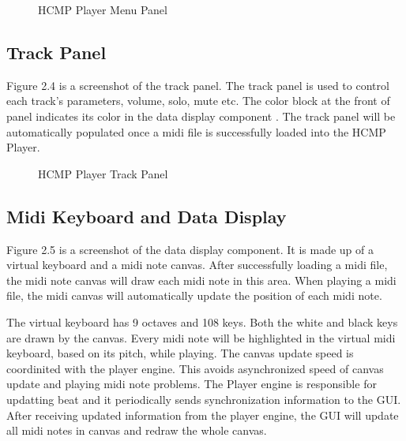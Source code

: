 \begin{figure}[H]
\caption{HCMP Player Menu Panel}
\label{fig:speciation}
\end{figure}

\subsection{Track Panel}

Figure 2.4 is a screenshot of the track panel. The track panel is used to 
control each track's parameters, volume, solo, mute etc. The color
block at the front of panel indicates its color in the data display component . The 
track panel will be automatically populated once a midi file is successfully 
loaded into the HCMP Player.
\begin{figure}[H]
\caption{HCMP Player Track Panel}
\label{fig:speciation}
\end{figure}

\subsection{Midi Keyboard and Data Display}
Figure 2.5 is a screenshot of the data display component. It is made up of a virtual  
keyboard and a midi note canvas. After successfully loading a midi file, the midi 
note canvas will 
draw each midi note in this area. When playing a midi file, the midi canvas will 
automatically update the position of each midi note. 

The virtual keyboard has 9 octaves and 108 keys. Both the white and black keys 
are drawn by the canvas. Every midi note will be highlighted in the 
virtual midi keyboard, based on its pitch, while playing. The canvas update speed is 
coordinited with the player engine. This avoids asynchronized speed 
of canvas update and playing midi note problems. The Player engine is responsible for 
updatting beat and it 
periodically sends synchronization information to the GUI. After receiving updated 
information from the player engine, the GUI will update all midi notes in canvas and redraw
the whole canvas.

